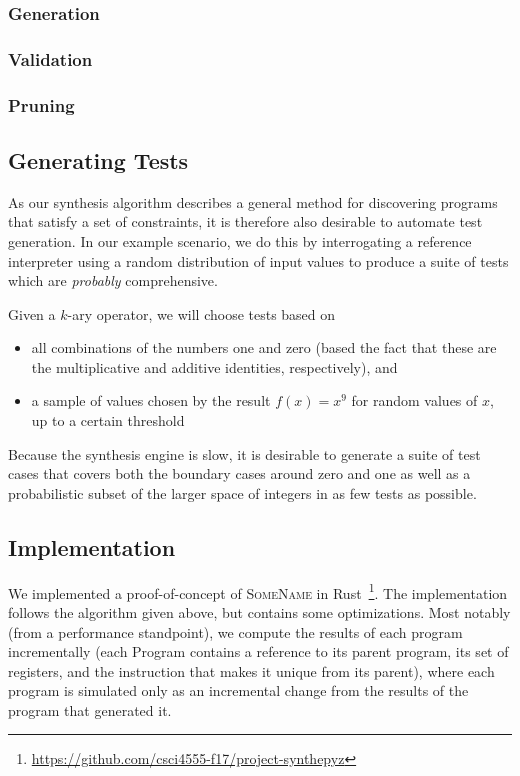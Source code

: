 \documentclass{article}
\begin{document}
\subsubsection{Generation}

\subsubsection{Validation}

\subsubsection{Pruning}

\subsection{Generating Tests}

As our synthesis algorithm describes a general method for discovering programs
that satisfy a set of constraints, it is therefore also desirable to automate
test generation.  In our example scenario, we do this by interrogating a
reference interpreter using a random distribution of input values to produce
a suite of tests which are \textit{probably} comprehensive.

Given a $k$-ary operator, we will choose tests based on
\begin{itemize}
    \item all combinations of the numbers one and zero (based the fact that
	these are the multiplicative and additive identities, respectively),
	and
    \item a sample of values chosen by the result $f(x)=x^{9}$ for random
	values of $x$, up to a certain threshold
\end{itemize}

Because the synthesis engine is slow, it is desirable to generate a suite of
test cases that covers both the boundary cases around zero and one as well as
a probabilistic subset of the larger space of integers in as few tests as
possible.

\subsection{Implementation}
\label{sec:implementation}

We implemented a proof-of-concept of \textsc{SomeName} in
Rust~\footnote{\url{https://github.com/csci4555-f17/project-synthepyz}}.
The implementation follows the algorithm given above, but contains some
optimizations.  Most notably (from a performance standpoint), we compute the
results of each program incrementally (each Program contains a reference to its
parent program, its set of registers, and the instruction that makes it unique
from its parent), where each program is simulated only as an incremental change
from the results of the program that generated it.
\end{document}
